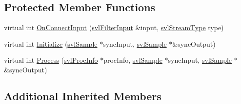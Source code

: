 \subsection*{Protected Member Functions}
\begin{DoxyCompactItemize}
\item 
virtual int \hyperlink{classsvl_filter_image_color_segmentation_a5396cde4fea23661f3ad6832210873fd}{On\-Connect\-Input} (\hyperlink{classsvl_filter_input}{svl\-Filter\-Input} \&input, \hyperlink{svl_definitions_8h_aa00696d338a58db361335a01fd11e122}{svl\-Stream\-Type} type)
\item 
virtual int \hyperlink{classsvl_filter_image_color_segmentation_a10d99e769ae65bfc2da0ea73996bea3b}{Initialize} (\hyperlink{classsvl_sample}{svl\-Sample} $\ast$sync\-Input, \hyperlink{classsvl_sample}{svl\-Sample} $\ast$\&sync\-Output)
\item 
virtual int \hyperlink{classsvl_filter_image_color_segmentation_a0e6898996529c89fc7dbf559aa825cb3}{Process} (\hyperlink{structsvl_proc_info}{svl\-Proc\-Info} $\ast$proc\-Info, \hyperlink{classsvl_sample}{svl\-Sample} $\ast$sync\-Input, \hyperlink{classsvl_sample}{svl\-Sample} $\ast$\&sync\-Output)
\end{DoxyCompactItemize}
\subsection*{Additional Inherited Members}



